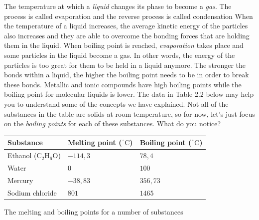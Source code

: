 \begin{enumerate}[noitemsep, label=\textbf{\arabic*}. ]
 { \label{m38734*meaningfhsst!!!underscore!!!id282}
The temperature at which a \textsl{liquid} changes 
its phase to become a \textsl{gas}. The process is 
called evaporation and the reverse process is called condensation 
 } 
When the temperature of a liquid increases, the average 
kinetic energy of the particles also increases and they are able to overcome 
the bonding forces that are holding them in the liquid. When boiling point is 
reached, \textsl{evaporation} takes place and some 
particles in the liquid become a gas. In other words, the energy of the 
particles is too great for them to be held in a liquid anymore. The stronger the 
bonds within a liquid, the higher the boiling point needs to be in order to 
break these bonds. Metallic and ionic compounds have high boiling points while 
the boiling point for molecular liquids is lower.
The data in Table 2.2 below may help you to understand some of 
the concepts we have explained. Not all of the substances in the table are 
solids at room temperature, so for now, let's just focus on the \textsl{boiling points} for each of these substances. What do 
you notice?
\begin{table}[H]
 \begin{center}
      \label{m38734*uid45}
\begin{tabular}{|l|l|l|}\hline
\textbf{Substance} & \textbf{Melting point (${}^{\ensuremath{{\,}^{\circ}}}\mathrm{C}$)} & \textbf{Boiling point (${}^{\ensuremath{{\,}^{\circ}}}\mathrm{C}$)} \\ \hline
Ethanol (${\mathrm{C}}_{2}{\mathrm{H}}_{6}\mathrm{O}$) & $-114,3$ & $78,4$ \\ \hline
Water                    & $0$      & $100$  \\ \hline
Mercury                                                & $-38,83$ & $356,73$ \\ \hline
Sodium chloride & $801$ & $1465$ \\ \hline
    \end{tabular}
      \end{center}
    \begin{caption}{The melting and boiling points for a number of substances}\end{caption}
\end{table}


\end{enumerate}
